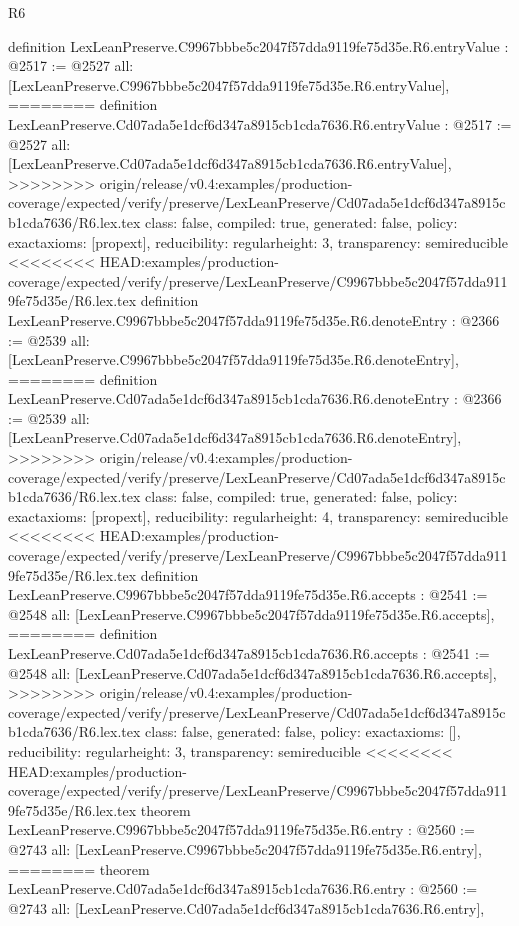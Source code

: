 \begin{lexlean}{R6}
\begin{coremodule}
{{{{{{{{{{{{{{definition LexLeanPreserve.C9967bbbe5c2047f57dda9119fe75d35e.R6.entryValue : @2517 := @2527 {
  all: [LexLeanPreserve.C9967bbbe5c2047f57dda9119fe75d35e.R6.entryValue],
========
definition LexLeanPreserve.Cd07ada5e1dcf6d347a8915cb1cda7636.R6.entryValue : @2517 := @2527 {
  all: [LexLeanPreserve.Cd07ada5e1dcf6d347a8915cb1cda7636.R6.entryValue],
>>>>>>>> origin/release/v0.4:examples/production-coverage/expected/verify/preserve/LexLeanPreserve/Cd07ada5e1dcf6d347a8915cb1cda7636/R6.lex.tex
  class: false,
  compiled: true,
  generated: false,
  policy: exact{axioms: [propext]},
  reducibility: regular{height: 3},
  transparency: semireducible
}
<<<<<<<< HEAD:examples/production-coverage/expected/verify/preserve/LexLeanPreserve/C9967bbbe5c2047f57dda9119fe75d35e/R6.lex.tex
definition LexLeanPreserve.C9967bbbe5c2047f57dda9119fe75d35e.R6.denoteEntry : @2366 := @2539 {
  all: [LexLeanPreserve.C9967bbbe5c2047f57dda9119fe75d35e.R6.denoteEntry],
========
definition LexLeanPreserve.Cd07ada5e1dcf6d347a8915cb1cda7636.R6.denoteEntry : @2366 := @2539 {
  all: [LexLeanPreserve.Cd07ada5e1dcf6d347a8915cb1cda7636.R6.denoteEntry],
>>>>>>>> origin/release/v0.4:examples/production-coverage/expected/verify/preserve/LexLeanPreserve/Cd07ada5e1dcf6d347a8915cb1cda7636/R6.lex.tex
  class: false,
  compiled: true,
  generated: false,
  policy: exact{axioms: [propext]},
  reducibility: regular{height: 4},
  transparency: semireducible
}
<<<<<<<< HEAD:examples/production-coverage/expected/verify/preserve/LexLeanPreserve/C9967bbbe5c2047f57dda9119fe75d35e/R6.lex.tex
definition LexLeanPreserve.C9967bbbe5c2047f57dda9119fe75d35e.R6.accepts : @2541 := @2548 {
  all: [LexLeanPreserve.C9967bbbe5c2047f57dda9119fe75d35e.R6.accepts],
========
definition LexLeanPreserve.Cd07ada5e1dcf6d347a8915cb1cda7636.R6.accepts : @2541 := @2548 {
  all: [LexLeanPreserve.Cd07ada5e1dcf6d347a8915cb1cda7636.R6.accepts],
>>>>>>>> origin/release/v0.4:examples/production-coverage/expected/verify/preserve/LexLeanPreserve/Cd07ada5e1dcf6d347a8915cb1cda7636/R6.lex.tex
  class: false,
  generated: false,
  policy: exact{axioms: []},
  reducibility: regular{height: 3},
  transparency: semireducible
}
<<<<<<<< HEAD:examples/production-coverage/expected/verify/preserve/LexLeanPreserve/C9967bbbe5c2047f57dda9119fe75d35e/R6.lex.tex
theorem LexLeanPreserve.C9967bbbe5c2047f57dda9119fe75d35e.R6.entry : @2560 := @2743 {
  all: [LexLeanPreserve.C9967bbbe5c2047f57dda9119fe75d35e.R6.entry],
========
theorem LexLeanPreserve.Cd07ada5e1dcf6d347a8915cb1cda7636.R6.entry : @2560 := @2743 {
  all: [LexLeanPreserve.Cd07ada5e1dcf6d347a8915cb1cda7636.R6.entry],
}}}}}}}}}}}}}}}}}}}
\end{coremodule}
\end{lexlean}

